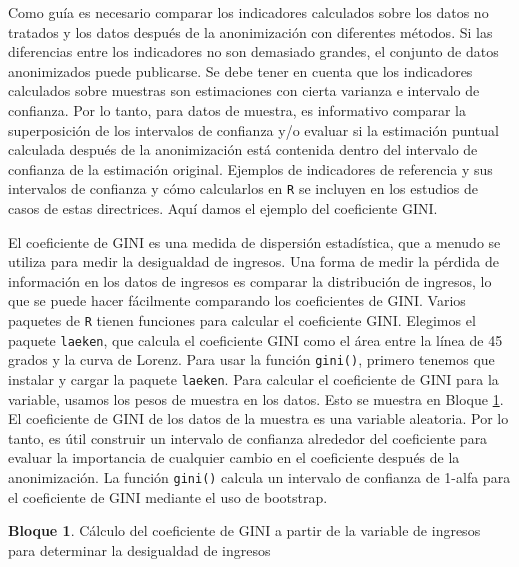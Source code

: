 \documentclass[
]{book}
\theoremstyle{definition}
\theoremstyle{definition}
\newtheorem{example}{Bloque}[chapter]
\theoremstyle{definition}
\theoremstyle{definition}
\theoremstyle{remark}
\begin{document}
Como guía es necesario comparar los indicadores calculados sobre los datos no tratados y los datos después de la anonimización con diferentes métodos. Si las diferencias entre los indicadores no son demasiado grandes, el conjunto de datos anonimizados puede publicarse. Se debe tener en cuenta que los indicadores calculados sobre muestras son estimaciones con cierta varianza e intervalo de confianza. Por lo tanto, para datos de muestra, es informativo comparar la superposición de los intervalos de confianza y/o evaluar si la estimación puntual calculada después de la anonimización está contenida dentro del intervalo de confianza de la estimación original. Ejemplos de indicadores de referencia y sus intervalos de confianza y cómo calcularlos en \texttt{R} se incluyen en los estudios de casos de estas directrices. Aquí damos el ejemplo del coeficiente GINI.

El coeficiente de GINI es una medida de dispersión estadística, que a menudo se utiliza para medir la desigualdad de ingresos. Una forma de medir la pérdida de información en los datos de ingresos es comparar la distribución de ingresos, lo que se puede hacer fácilmente comparando los coeficientes de GINI. Varios paquetes de \texttt{R} tienen funciones para calcular el coeficiente GINI. Elegimos el paquete \texttt{laeken}, que calcula el coeficiente GINI como el área entre la línea de 45 grados y la curva de Lorenz. Para usar la función \texttt{gini()}, primero tenemos que instalar y cargar la paquete \texttt{laeken}. Para calcular el coeficiente de GINI para la variable, usamos los pesos de muestra en los datos. Esto se muestra en Bloque \ref{exm:bloque9lbn}. El coeficiente de GINI de los datos de la muestra es una variable aleatoria. Por lo tanto, es útil construir un intervalo de confianza alrededor del coeficiente para evaluar la importancia de cualquier cambio en el coeficiente después de la anonimización. La función \texttt{gini()} calcula un intervalo de confianza de 1-alfa para el coeficiente de GINI mediante el uso de bootstrap.

\begin{example}
\protect\hypertarget{exm:bloque9lbn}{}\label{exm:bloque9lbn}Cálculo del coeficiente de GINI a partir de la variable de ingresos para determinar la desigualdad de ingresos
\end{example}
\end{document}
